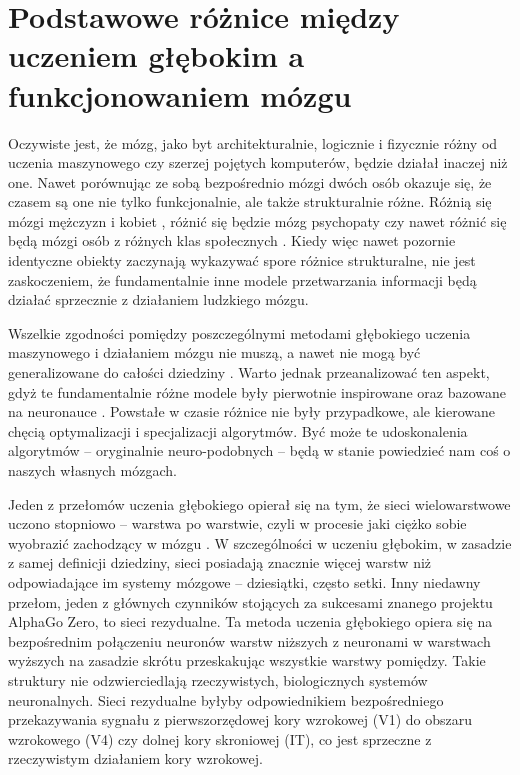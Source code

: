 \section{Podstawowe różnice między uczeniem głębokim a funkcjonowaniem mózgu}

Oczywiste jest, że mózg, jako byt architekturalnie, logicznie i fizycznie różny od uczenia maszynowego czy szerzej pojętych komputerów, będzie działał inaczej niż one.
Nawet porównując ze sobą bezpośrednio mózgi dwóch osób okazuje się, że czasem są one nie tylko funkcjonalnie, ale także strukturalnie różne.
Różnią się mózgi mężczyzn i kobiet \cite{ingalhalikar2014sex}, różnić się będzie mózg psychopaty \cite{fallon2017neuroanatomical} czy nawet różnić się będą mózgi osób z różnych klas społecznych \cite{rushton1996brain}.
Kiedy więc nawet pozornie identyczne obiekty zaczynają wykazywać spore różnice strukturalne, nie jest zaskoczeniem, że fundamentalnie inne modele przetwarzania informacji będą działać sprzecznie z działaniem ludzkiego mózgu.

Wszelkie zgodności pomiędzy poszczególnymi metodami głębokiego uczenia maszynowego i działaniem mózgu nie muszą, a nawet nie mogą być generalizowane do całości dziedziny \cite{de2018deep}.
Warto jednak przeanalizować ten aspekt, gdyż te fundamentalnie różne modele były pierwotnie inspirowane oraz bazowane na neuronauce \cite{hassabis2017neuroscience}.
Powstałe w czasie różnice nie były przypadkowe, ale kierowane chęcią optymalizacji i specjalizacji algorytmów.
Być może te udoskonalenia algorytmów -- oryginalnie neuro-podobnych -- będą w stanie powiedzieć nam coś o naszych własnych mózgach.

Jeden z przełomów uczenia głębokiego opierał się na tym, że sieci wielowarstwowe uczono stopniowo -- warstwa po warstwie, czyli w procesie jaki ciężko sobie wyobrazić zachodzący w mózgu \cite{hinton2006fast}.
W szczególności w uczeniu głębokim, w zasadzie z samej definicji dziedziny, sieci posiadają znacznie więcej warstw niż odpowiadające im systemy mózgowe -- dziesiątki, często setki.
Inny niedawny przełom, jeden z głównych czynników stojących za sukcesami znanego projektu AlphaGo Zero, to sieci rezydualne.
Ta metoda uczenia głębokiego opiera się na bezpośrednim połączeniu neuronów warstw niższych z neuronami w warstwach wyższych na zasadzie skrótu przeskakując wszystkie warstwy pomiędzy.
Takie struktury nie odzwierciedlają rzeczywistych, biologicznych systemów neuronalnych.
Sieci rezydualne byłyby odpowiednikiem bezpośredniego przekazywania sygnału z pierwszorzędowej kory wzrokowej (V1) do obszaru wzrokowego (V4) czy dolnej kory skroniowej (IT), co jest sprzeczne z rzeczywistym działaniem kory wzrokowej.

